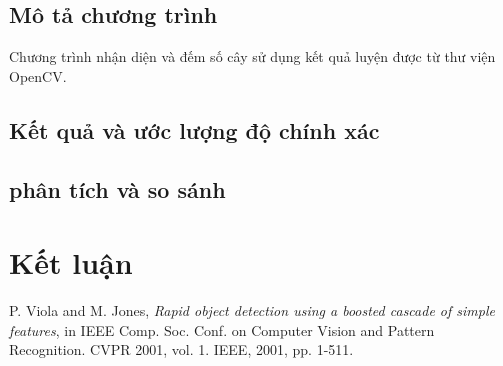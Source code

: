 \documentclass[14pt, oneside, a4paper, openany]{scrartcl}
\begin{document}
\subsection{Mô tả chương trình}
Chương trình nhận diện và đếm số cây sử dụng kết quả luyện được từ thư viện OpenCV.
\subsection{Kết quả và ước lượng độ chính xác}

\subsection{phân tích và so sánh}

\newpage
\section{Kết luận}
\printindex
\newpage
\begin{thebibliography}{9}
	P. Viola and M. Jones,
	\textit{Rapid object detection using a boosted cascade of simple features},
	in IEEE Comp. Soc. Conf. on Computer Vision and Pattern Recognition. CVPR 2001, vol. 1. IEEE, 2001, pp. 1-511.
\end{thebibliography}
\end{document}
